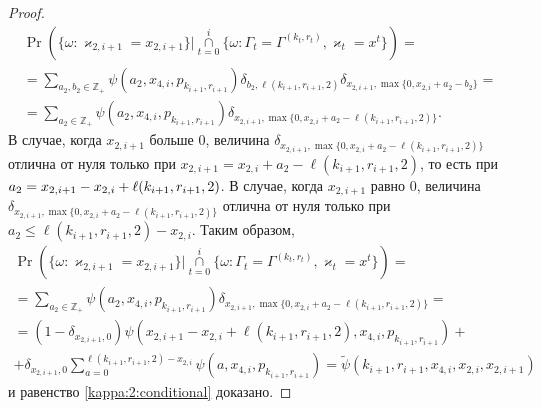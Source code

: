 \documentclass[a4paper,12pt,russian]{extarticle}
\begin{document}
\begin{proof}
\begin{multline*}
\Pr (\{ \omega \colon \varkappa_{2,i+1} = x_{2,i+1}\} |\mathop{\cap}\limits_{t=0}^{i}\{\omega\colon \Gamma_t=\Gamma^{(k_t,r_t)}, \varkappa_t=x^t\}) =\\
=\sum_{a_2,b_2\in \mathbb{Z}_+}\psi(a_2,x_{4,i}, p_{k_{i+1},r_{i+1}})  \delta_{b_2,\ell(k_{i+1},r_{i+1},2)}   \delta_{x_{2,i+1},\max\{0,x_{2,i}+a_2-b_2\}}= \\
=\sum_{a_2\in \mathbb{Z}_+}\psi(a_2,x_{4,i}, p_{k_{i+1},r_{i+1}})   \delta_{x_{2,i+1},\max\{0,x_{2,i}+a_2-\ell(k_{i+1},r_{i+1},2)\}}.
\end{multline*}
В случае, когда $x_{2,i+1}$ больше $0$, величина $\delta_{x_{2,i+1},\max\{0,x_{2,i}+a_2-\ell(k_{i+1},r_{i+1},2)\}}$ отлична от нуля только при $x_{2,i+1}=x_{2,i}+a_2-\ell(k_{i+1},r_{i+1},2)$, то есть при $a_2=x_{2,i+1}-x_{2,i}\hm+\ell(k_{i+1},r_{i+1},2)$. В случае, когда $x_{2,i+1}$ равно $0$, величина $\delta_{x_{2,i+1},\max\{0,x_{2,i}+a_2-\ell(k_{i+1},r_{i+1},2)\}}$ отлична от нуля только при $ a_2\leqslant \ell(k_{i+1},r_{i+1},2)-x_{2,i}$. Таким образом,
\begin{multline*}
\Pr (\{ \omega \colon \varkappa_{2,i+1} = x_{2,i+1}\} |\mathop{\cap}\limits_{t=0}^{i}\{\omega\colon \Gamma_t=\Gamma^{(k_t,r_t)}, \varkappa_t=x^t\}) = \\
= \sum_{a_2\in \mathbb{Z}_+}\psi(a_2,x_{4,i}, p_{k_{i+1},r_{i+1}})   \delta_{x_{2,i+1},\max\{0,x_{2,i}+a_2-\ell(k_{i+1},r_{i+1},2)\}} = \\
=(1 - \delta_{x_{2,i+1},0})\psi(x_{2,i+1}-x_{2,i}+\ell(k_{i+1},r_{i+1},2),x_{4,i}, p_{k_{i+1},r_{i+1}})  + \\
+ \delta_{x_{2,i+1},0}\sum_{a=0}^{\ell(k_{i+1},r_{i+1},2)-x_{2,i}} \psi(a,x_{4,i}, p_{k_{i+1},r_{i+1}})= \widetilde{\psi}(k_{i+1},r_{i+1},x_{4,i},x_{2,i},x_{2,i+1})
\end{multline*}
и равенство \eqref{kappa:2:conditional} доказано.
\end{proof}
\end{document}
